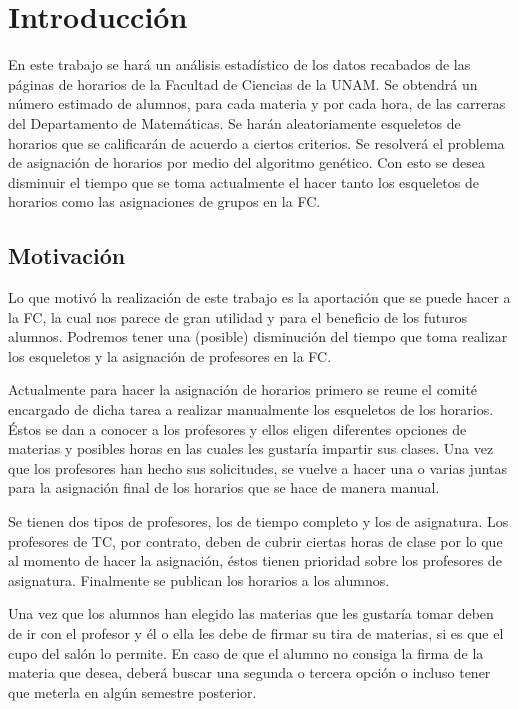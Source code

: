 \chapter{Introducción}

En este trabajo se hará un análisis estadístico de los datos recabados de las páginas de horarios de la Facultad de Ciencias de la UNAM. Se obtendrá un número estimado de alumnos, para cada materia y por cada hora, de las carreras del Departamento de Matemáticas. Se harán aleatoriamente esqueletos de horarios que se calificarán de acuerdo a ciertos criterios. Se resolverá el problema de asignación de horarios por medio del algoritmo genético. Con esto se desea disminuir el tiempo que se toma actualmente el hacer tanto los esqueletos de horarios como las asignaciones de grupos en la FC.

\section{Motivación}

Lo que motivó la realización de este trabajo es la aportación que se puede hacer a la FC, la cual nos parece de gran utilidad y para el beneficio de los futuros alumnos. Podremos tener una (posible) disminución del tiempo que toma realizar los esqueletos y la asignación de profesores en la FC.

Actualmente para hacer la asignación de horarios primero se reune el comité encargado de dicha tarea a realizar manualmente los esqueletos de los horarios. Éstos se dan a conocer a los profesores y ellos eligen diferentes opciones de materias y posibles horas en las cuales les gustaría impartir sus clases. Una vez que los profesores han hecho sus solicitudes, se vuelve a hacer una o varias juntas para la asignación final de los horarios que se hace de manera manual.

Se tienen dos tipos de profesores, los de tiempo completo y los de asignatura. Los profesores de TC, por contrato, deben de cubrir ciertas horas de clase por lo que al momento de hacer la asignación, éstos tienen prioridad sobre los profesores de asignatura. Finalmente se publican los horarios a los alumnos.

Una vez que los alumnos han elegido las materias que les gustaría tomar deben de ir con el profesor y él o ella les debe de firmar su tira de materias, si es que el cupo del salón lo permite. En caso de que el alumno no consiga la firma de la materia que desea, deberá buscar una segunda o tercera opción o incluso tener que meterla en algún semestre posterior.

